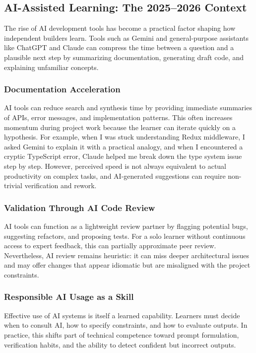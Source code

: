 \subsection{AI-Assisted Learning: The 2025--2026 Context}

The rise of AI development tools has become a practical factor shaping how independent builders learn. Tools such as Gemini and general-purpose assistants like ChatGPT and Claude can compress the time between a question and a plausible next step by summarizing documentation, generating draft code, and explaining unfamiliar concepts.

\subsubsection{Documentation Acceleration}

AI tools can reduce search and synthesis time by providing immediate summaries of APIs, error messages, and implementation patterns. This often increases momentum during project work because the learner can iterate quickly on a hypothesis. For example, when I was stuck understanding Redux middleware, I asked Gemini to explain it with a practical analogy, and when I encountered a cryptic TypeScript error, Claude helped me break down the type system issue step by step. However, perceived speed is not always equivalent to actual productivity on complex tasks, and AI-generated suggestions can require non-trivial verification and rework.

\subsubsection{Validation Through AI Code Review}

AI tools can function as a lightweight review partner by flagging potential bugs, suggesting refactors, and proposing tests. For a solo learner without continuous access to expert feedback, this can partially approximate peer review. Nevertheless, AI review remains heuristic: it can miss deeper architectural issues and may offer changes that appear idiomatic but are misaligned with the project constraints.

\subsubsection{Responsible AI Usage as a Skill}

Effective use of AI systems is itself a learned capability. Learners must decide when to consult AI, how to specify constraints, and how to evaluate outputs. In practice, this shifts part of technical competence toward prompt formulation, verification habits, and the ability to detect confident but incorrect outputs.

